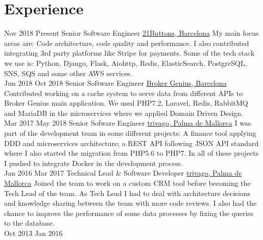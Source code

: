 \documentclass[letterpaper]{twentysecondcv} %
\begin{document}
\makeprofile %



\section{Experience}

\begin{twenty} %
\twentyitem
	{Nov 2018}
	{Present}
	{Senior Software Engineer}
	{\href{https://www.21buttons.com}{21Buttons, Barcelona}}
	{My main focus areas are: Code architecture, code quality and performance. I also contributed integrating 3rd party platforms like Stripe for payments.
        Some of the tech stack we use is: Python, Django, Flask, Aiohttp, Redis, ElasticSearch, PostgreSQL, SNS, SQS and some other AWS services.}
	\\
\twentyitem
	{Jun 2018}
	{Oct 2018}
	{Senior Software Engineer}
	{\href{https://brokergenius.com}{Broker Genius, Barcelona}}
	{Contributed working on a cache system to serve data from different APIs to Broker Genius main application. We used PHP7.2, Laravel, Redis, RabbitMQ and MariaDB in the microservices where we applied Domain Driven Design.}
	\\
\twentyitem
    	{Mar 2017}
	{May 2018}
        {Senior Sofware Engineer}
        {\href{https://www.trivago.com}{trivago, Palma de Mallorca}}
	{I was part of the development team in some different projects: A finance tool applying DDD and microservices architecture; a REST API following JSON API standard where I also started the migration from PHP5.6 to PHP7. In all of these projects I pushed to integrate Docker in the development process.}
        \\
\twentyitem
    	{Jan 2016}
	{Mar 2017}
        {Technical Lead \& Software Developer}
        {\href{https://www.trivago.com}{trivago, Palma de Mallorca}}
	{Joined the team to work on a custom CRM tool before becoming the Tech Lead of the team. As Tech Lead I had to deal with architecture decisions and knowledge sharing between the team with more code reviews. I also had the chance to improve the performance of some data processes by fixing the queries to the database.}
        \\
\twentyitem
   	{Oct 2013}
	{Jan 2016}

\end{twenty}
\end{document}
